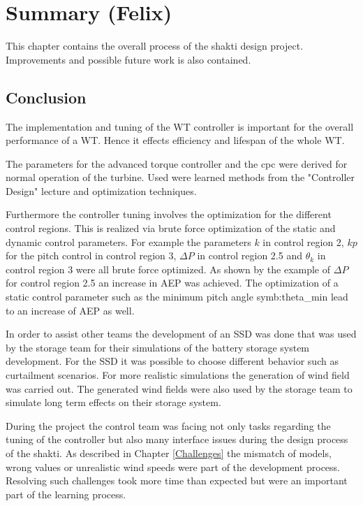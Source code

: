 \chapter{Summary (Felix)}
This chapter contains the overall process of the \gls{shakti} design project.
Improvements and possible future work is also contained.
\section{Conclusion}
The implementation and tuning of the \gls{WT} controller is important for the overall performance of a \gls{WT}. 
Hence it effects efficiency and lifespan of the whole \gls{WT}.

The parameters for the advanced torque controller and the \gls{cpc} were derived for normal operation of the turbine. Used were learned methods from the "Controller Design" lecture and optimization techniques.

Furthermore the controller tuning involves the optimization for the different control regions.
This is realized via brute force optimization of the static and dynamic control parameters.
For example the parameters $k$ in control region 2, $kp$ for the pitch control in control region 3, $\Delta P$ in  control region 2.5 and $\theta_k$ in control region 3 were all brute force optimized.
As shown by the example of $\Delta P$ for control region 2.5 an increase in \gls{AEP} was achieved.
The optimization of a static control parameter such as the minimum pitch angle \gls{symb:theta_min} lead to an increase of \gls{AEP} as well.

In order to assist other teams the development of an \gls{SSD} was done that was used by the storage team for their simulations of the battery storage system development.
For the \gls{SSD} it was possible to choose different behavior such as curtailment scenarios.
For more realistic simulations the generation of wind field was carried out. The generated wind fields were also used by the storage team to simulate long term effects on their storage system.

During the project the control team was facing not only tasks regarding the tuning of the controller but also many interface issues during the design process of the \gls{shakti}.
As described in Chapter \ref{Challenges} the mismatch of models, wrong values or unrealistic wind speeds were part of the development process. 
Resolving such challenges took more time than expected but were an important part of the learning process. 

